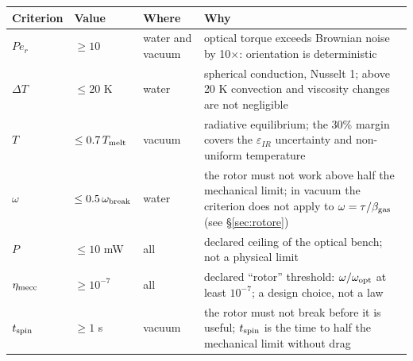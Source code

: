 \begin{tabular}{@{}p{2.4cm}p{2.1cm}p{2.4cm}p{8.6cm}@{}}
\hline
Criterion & Value & Where & Why \\
\hline
$Pe_r$ & $\ge 10$ & water and vacuum &
  optical torque exceeds Brownian noise by 10$\times$: orientation is deterministic \\
$\Delta T$ & $\le 20$ K & water &
  spherical conduction, Nusselt 1; above 20 K convection and viscosity changes are not negligible \\
$T$ & $\le 0.7\,T_{\rm melt}$ & vacuum &
  radiative equilibrium; the 30\% margin covers the $\varepsilon_{IR}$ uncertainty and non-uniform temperature \\
$\omega$ & $\le 0.5\,\omega_{\rm break}$ & water &
  the rotor must not work above half the mechanical limit; in vacuum the criterion does not apply to $\omega=\tau/\beta_{\rm gas}$ (see \S\ref{sec:rotore}) \\
$P$ & $\le 10$ mW & all &
  declared ceiling of the optical bench; not a physical limit \\
$\eta_{\rm mecc}$ & $\ge 10^{-7}$ & all &
  declared ``rotor'' threshold: $\omega/\omega_{\rm opt}$ at least $10^{-7}$; a design choice, not a law \\
$t_{\rm spin}$ & $\ge 1$ s & vacuum &
  the rotor must not break before it is useful; $t_{\rm spin}$ is the time to half the mechanical limit without drag \\
\hline
\end{tabular}
